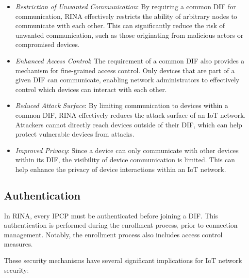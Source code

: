 \documentclass{ieeeaccess}
\begin{document}
\begin{itemize}
	\item \textit{Restriction of Unwanted Communication}: By requiring a common DIF for communication, RINA effectively restricts the ability of arbitrary nodes to communicate with each other. This can significantly reduce the risk of unwanted communication, such as those originating from malicious actors or compromised devices.
	\item \textit{Enhanced Access Control}: The requirement of a common DIF also provides a mechanism for fine-grained access control. Only devices that are part of a given DIF can communicate, enabling network administrators to effectively control which devices can interact with each other.
	\item \textit{Reduced Attack Surface}: By limiting communication to devices within a common DIF, RINA effectively reduces the attack surface of an IoT network. Attackers cannot directly reach devices outside of their DIF, which can help protect vulnerable devices from attacks.
	\item \textit{Improved Privacy}: Since a device can only communicate with other devices within its DIF, the visibility of device communication is limited. This can help enhance the privacy of device interactions within an IoT network.
\end{itemize}

\subsection{Authentication}
In RINA, every IPCP must be authenticated before joining a DIF. This authentication is performed during the enrollment process, prior to connection management. Notably, the enrollment process also includes access control measures.

These security mechanisms have several significant implications for IoT network security:
\end{document}
